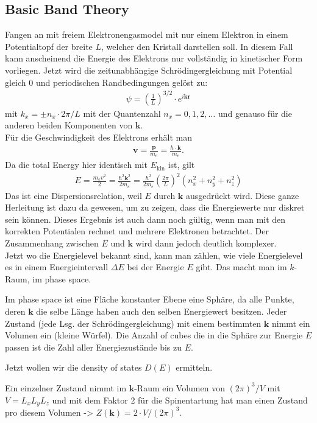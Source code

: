\documentclass[paper=a4,10pt]{scrartcl}
\begin{document}
\subsection{Basic Band Theory}
Fangen an mit freiem Elektronengasmodel mit nur einem Elektron in einem Potentialtopf der breite $L$, welcher den Kristall darstellen soll. In diesem Fall kann anscheinend die Energie des Elektrons nur vollständig in kinetischer Form vorliegen. Jetzt wird die zeitunabhängige Schrödingergleichung  mit Potential gleich 0 und periodischen Randbedingungen gelöst zu:
\begin{align}
\psi = \left( \frac{1}{L}	\right)^{3/2} \cdot e^{i  \bm k \bm r}
\end{align}
mit $k_x = \pm n_x \cdot 2\pi / L$ mit der Quantenzahl $n_x=0,1,2,\dots$ und genauso für die anderen beiden Komponenten von $\bm k$.\\
Für die Geschwindigkeit des Elektrons erhält man 
\begin{align}
\bm v = \frac{\bm p}{m_e} = \frac{\hbar \cdot \bm k}{m_e}.
\end{align}
Da die total Energy hier identisch mit $E_{\text{kin}}$ ist, gilt
\begin{align}
E = \frac{m_e v^2}{2} = \frac{\hbar^2 \bm k^2}{2m_e} = \frac{\hbar^2}{2m_e} \left( \frac{2\pi}{L} \right)^2 (n_x^2 +n_y^2 + n_z^2)
\end{align}
Das ist eine Dispersionsrelation, weil $E$ durch $\bm k$ ausgedrückt wird.
Diese ganze Herleitung ist dazu da gewesen, um zu zeigen, dass die Energiewerte nur diskret sein können. Dieses Ergebnis ist auch dann noch gültig, wenn man mit den korrekten Potentialen rechnet und mehrere Elektronen betrachtet. Der Zusammenhang zwischen $E$ und $\bm k$ wird dann jedoch deutlich komplexer.\\
Jetzt wo die Energielevel bekannt sind, kann man zählen, wie viele Energielevel es in einem Energieintervall $\Delta E$ bei der Energie $E$ gibt. Das macht man im $k$-Raum, im phase space.

Im phase space ist eine Fläche konstanter Ebene eine Sphäre, da alle Punkte, deren $\bm k$ die selbe Länge haben auch den selben Energiewert besitzen.
Jeder Zustand (jede Lsg. der Schrödingergleichung) mit einem bestimmten $\bm k$ nimmt ein Volumen ein (kleine Würfel).
Die Anzahl of cubes die in die Sphäre zur Energie $E$ passen ist die Zahl aller Energiezustände bis zu $E$.

Jetzt wollen wir die density of states $D(E)$ ermitteln.

Ein einzelner Zustand nimmt im $\bm k$-Raum ein Volumen von $(2\pi)^3/V$ mit $V=L_xL_yL_z$ und mit dem Faktor 2 für die Spinentartung hat man einen Zustand pro diesem Volumen -> $Z(\bm k) = 2 \cdot V/(2\pi)^3$. 
\end{document}
